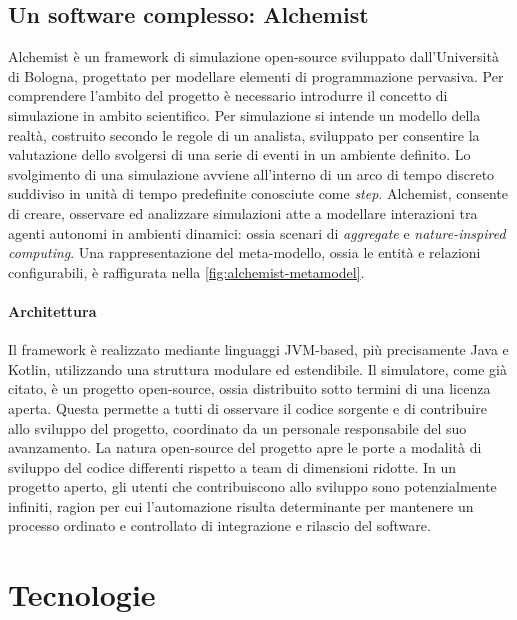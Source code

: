 \subsection{Un software complesso: Alchemist}\label{sec:alchemist}
Alchemist\cite{Pianini_2013} è un framework di simulazione open-source sviluppato dall'Università di Bologna, progettato per modellare elementi di programmazione pervasiva. Per comprendere l'ambito del progetto è necessario introdurre il concetto di simulazione in ambito scientifico. Per simulazione si intende un modello della realtà, costruito secondo le regole di un analista, sviluppato per consentire la valutazione dello svolgersi di una serie di eventi in un ambiente definito. Lo svolgimento di una simulazione avviene all'interno di un arco di tempo discreto suddiviso in unità di tempo predefinite conosciute come \textit{step}. Alchemist, consente di creare, osservare ed analizzare simulazioni atte a modellare interazioni tra agenti autonomi in ambienti dinamici: ossia scenari di \textit{aggregate} e \textit{nature-inspired computing}. Una rappresentazione del meta-modello, ossia le entità e relazioni configurabili, è raffigurata nella \cref{fig:alchemist-metamodel}.


\paragraph{Architettura}
Il framework è realizzato mediante linguaggi JVM-based, più precisamente Java e Kotlin, utilizzando una struttura modulare ed estendibile. Il simulatore, come già citato, è un progetto open-source, ossia distribuito sotto termini di una licenza aperta. Questa permette a tutti di osservare il codice sorgente e di contribuire allo sviluppo del progetto, coordinato da un personale responsabile del suo avanzamento. La natura open-source del progetto apre le porte a modalità di sviluppo del codice differenti rispetto a team di dimensioni ridotte. In un progetto aperto, gli utenti che contribuiscono allo sviluppo sono potenzialmente infiniti, ragion per cui l'automazione risulta determinante per mantenere un processo ordinato e controllato di integrazione e rilascio del software.

\section{Tecnologie}\label{sec:technologies}


